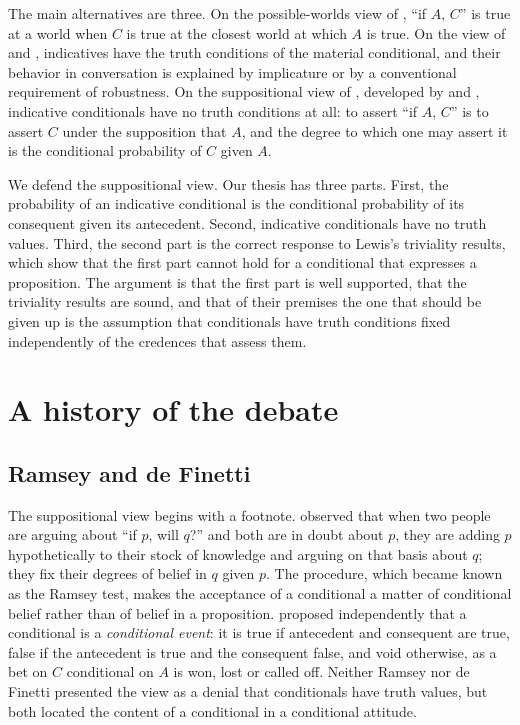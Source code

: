 \documentclass{situationist-preprint}
\begin{document}
The main alternatives are three. On the possible-worlds view of \citet{Stalnaker1968}, \enquote{if $A$, $C$} is true at a world when $C$ is true at the closest world at which $A$ is true. On the view of \citet{Jackson1979,Jackson1987} and \citet{Grice1989}, indicatives have the truth conditions of the material conditional, and their behavior in conversation is explained by implicature or by a conventional requirement of robustness. On the suppositional view of \citet{Adams1965,Adams1975}, developed by \citet{Edgington1986,Edgington1995} and \citet{Bennett2003}, indicative conditionals have no truth conditions at all: to assert \enquote{if $A$, $C$} is to assert $C$ under the supposition that $A$, and the degree to which one may assert it is the conditional probability of $C$ given $A$.

We defend the suppositional view. Our thesis has three parts. First, the probability of an indicative conditional is the conditional probability of its consequent given its antecedent. Second, indicative conditionals have no truth values. Third, the second part is the correct response to Lewis's triviality results, which show that the first part cannot hold for a conditional that expresses a proposition. The argument is that the first part is well supported, that the triviality results are sound, and that of their premises the one that should be given up is the assumption that conditionals have truth conditions fixed independently of the credences that assess them.

\section{A history of the debate}\label{s:history}

\subsection{Ramsey and de Finetti}

The suppositional view begins with a footnote. \citet{Ramsey1931} observed that when two people are arguing about \enquote{if $p$, will $q$?} and both are in doubt about $p$, they are adding $p$ hypothetically to their stock of knowledge and arguing on that basis about $q$; they fix their degrees of belief in $q$ given $p$. The procedure, which became known as the Ramsey test, makes the acceptance of a conditional a matter of conditional belief rather than of belief in a proposition. \citet{deFinetti1936} proposed independently that a conditional is a \emph{conditional event}: it is true if antecedent and consequent are true, false if the antecedent is true and the consequent false, and void otherwise, as a bet on $C$ conditional on $A$ is won, lost or called off. Neither Ramsey nor de Finetti presented the view as a denial that conditionals have truth values, but both located the content of a conditional in a conditional attitude.
\end{document}
